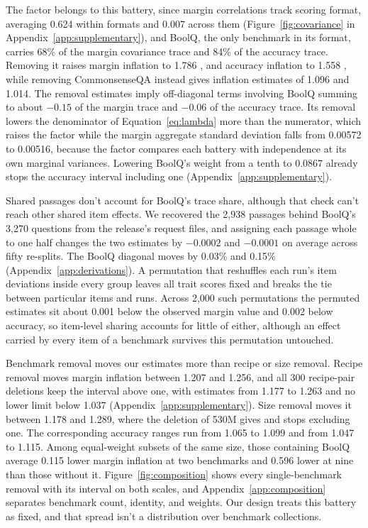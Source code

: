 The factor belongs to this battery, since margin correlations track scoring format, averaging 0.624 within formats and 0.007 across them (Figure~\ref{fig:covariance} in Appendix~\ref{app:supplementary}), and BoolQ, the only benchmark in its format, carries 68\% of the margin covariance trace and 84\% of the accuracy trace. Removing it raises margin inflation to 1.786 , and accuracy inflation to 1.558 , while removing CommonsenseQA instead gives inflation estimates of 1.096 and 1.014. The removal estimates imply off-diagonal terms involving BoolQ summing to about $-0.15$ of the margin trace and $-0.06$ of the accuracy trace. Its removal lowers the denominator of Equation~\ref{eq:lambda} more than the numerator, which raises the factor while the margin aggregate standard deviation falls from 0.00572 to 0.00516, because the factor compares each battery with independence at its own marginal variances. Lowering BoolQ's weight from a tenth to 0.0867 already stops the accuracy interval including one (Appendix~\ref{app:supplementary}).

Shared passages don't account for BoolQ's trace share, although that check can't reach other shared item effects. We recovered the 2,938 passages behind BoolQ's 3,270 questions from the release's request files, and assigning each passage whole to one half changes the two estimates by $-0.0002$ and $-0.0001$ on average across fifty re-splits. The BoolQ diagonal moves by 0.03\% and 0.15\% (Appendix~\ref{app:derivations}). A permutation that reshuffles each run's item deviations inside every group leaves all trait scores fixed and breaks the tie between particular items and runs. Across 2,000 such permutations the permuted estimates sit about 0.001 below the observed margin value and 0.002 below accuracy, so item-level sharing accounts for little of either, although an effect carried by every item of a benchmark survives this permutation untouched.

Benchmark removal moves our estimates more than recipe or size removal. Recipe removal moves margin inflation between 1.207 and 1.256, and all 300 recipe-pair deletions keep the interval above one, with estimates from 1.177 to 1.263 and no lower limit below 1.037 (Appendix~\ref{app:supplementary}). Size removal moves it between 1.178 and 1.289, where the deletion of 530M gives  and stops excluding one. The corresponding accuracy ranges run from 1.065 to 1.099 and from 1.047 to 1.115. Among equal-weight subsets of the same size, those containing BoolQ average 0.115 lower margin inflation at two benchmarks and 0.596 lower at nine than those without it. Figure~\ref{fig:composition} shows every single-benchmark removal with its interval on both scales, and Appendix~\ref{app:composition} separates benchmark count, identity, and weights. Our design treats this battery as fixed, and that spread isn't a distribution over benchmark collections.

